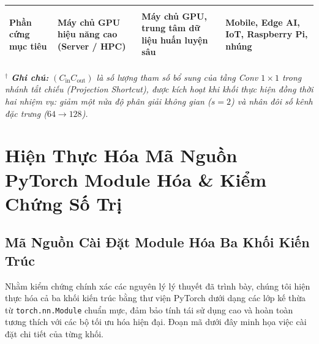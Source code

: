 \documentclass[12pt,a4paper]{report}
\begin{document}
\begin{table}[H]
\begin{tabularx}{\textwidth}{>{\bfseries\raggedright\arraybackslash}p{3.3cm} >{\raggedright\arraybackslash}X >{\raggedright\arraybackslash}X >{\raggedright\arraybackslash}X}
Phần cứng mục tiêu & 
Máy chủ GPU hiệu năng cao (Server / HPC) & 
Máy chủ GPU, trung tâm dữ liệu huấn luyện sâu & 
Mobile, Edge AI, IoT, Raspberry Pi, nhúng \\
\bottomrule
\end{tabularx}
\vspace{1.5mm}
\begin{tcolorbox}[colback=blue!2, colframe=blue!20, arc=1mm, boxrule=0.5pt, left=2mm, right=2mm, top=1mm, bottom=1mm]
\footnotesize\itshape $^{\dagger}$ \textbf{Ghi chú:} $(C_{\text{in}} C_{\text{out}})$ là số lượng tham số bổ sung của tầng Conv $1 \times 1$ trong nhánh tắt chiếu (Projection Shortcut), được kích hoạt khi khối thực hiện đồng thời hai nhiệm vụ: giảm một nửa độ phân giải không gian ($s=2$) và nhân đôi số kênh đặc trưng ($64 \to 128$).
\end{tcolorbox}
\end{table}


\section{Hiện Thực Hóa Mã Nguồn PyTorch Module Hóa \& Kiểm Chứng Số Trị}

\subsection{Mã Nguồn Cài Đặt Module Hóa Ba Khối Kiến Trúc}
Nhằm kiểm chứng chính xác các nguyên lý lý thuyết đã trình bày, chúng tôi hiện thực hóa cả ba khối kiến trúc bằng thư viện PyTorch dưới dạng các lớp kế thừa từ \texttt{torch.nn.Module} chuẩn mực, đảm bảo tính tái sử dụng cao và hoàn toàn tương thích với các bộ tối ưu hóa hiện đại. Đoạn mã dưới đây minh họa việc cài đặt chi tiết của từng khối.
\end{document}
